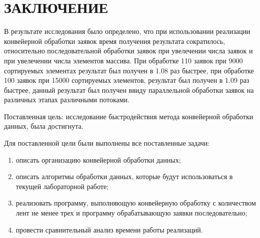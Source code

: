 \chapter*{\hfill{\centering  ЗАКЛЮЧЕНИЕ}\hfill}

В результате исследования было определено, что при использовании реализации конвейерной обработки заявок время получения результата сократилось, относительно последовательной обработки заявок при увелечении числа заявок и при увелечении числа элементов массива.
При обработке 110 заявок при 9000 сортируемых элементах результат был получен в 1.08 раз быстрее, при обработке 100 заявок при 15000 сортируемых элементов, результат был получен в 1.09 раз быстрее, данный результат был получен ввиду параллельной обработки заявок на различных этапах различными потоками.





Поставленная цель: исследование быстродействия метода конвейерной обработки данных, была достигнута.

Для поставленной цели были выполнены все поставленные задачи:
\begin{enumerate}
	\item описать организацию конвейерной обработки данных;
	\item описать алгоритмы обработки данных, которые будут использоваться в текущей лабораторной работе;
	\item реализовать программу, выполняющую конвейерную обработку с количеством лент не менее трех  и программу обрабатывающую заявки последовательно;
	\item провести сравнительный анализ времени работы реализаций.
\end{enumerate}

